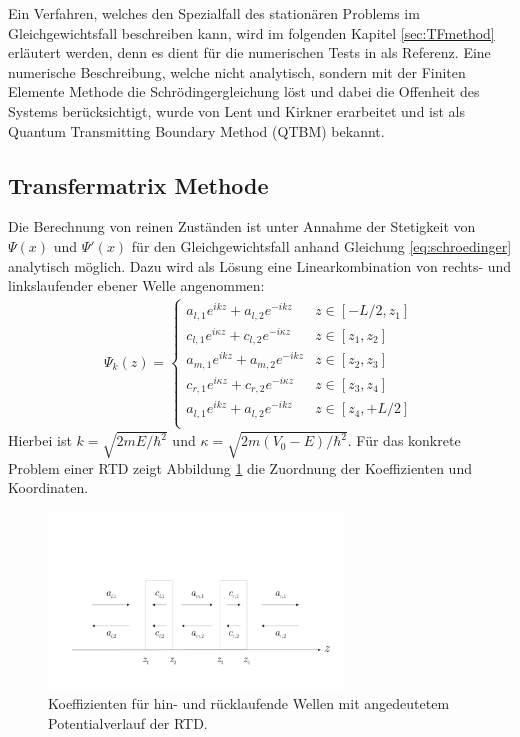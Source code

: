 Ein Verfahren, welches den Spezialfall des stationären Problems im Gleichgewichtsfall beschreiben kann, wird im folgenden Kapitel \ref{sec:TFmethod} erläutert werden, denn es dient für die numerischen Tests in  als Referenz. Eine numerische Beschreibung, welche nicht analytisch, sondern mit der Finiten Elemente Methode die Schrödingergleichung löst und dabei die Offenheit des Systems berücksichtigt, wurde von Lent und Kirkner \cite{qtbm} erarbeitet und ist als Quantum Transmitting Boundary Method (QTBM) bekannt.

\subsection{Transfermatrix Methode}
\label{sec:TFmethod}
Die Berechnung von reinen Zuständen ist unter Annahme der Stetigkeit von $\Psi(x)$ und $\Psi'(x)$ für den Gleichgewichtsfall anhand Gleichung \eqref{eq:schroedinger} analytisch möglich. Dazu wird als Lösung eine Linearkombination von rechts- und linkslaufender ebener Welle angenommen:
\begin{equation}
  \begin{aligned}
    \Psi_k(z)=
    \begin{cases}
    a_{l,1}e^{ikz} + a_{l,2}e^{-ikz}              & z\in[-L/2,z_1] \\
    c_{l,1}e^{i\kappa z} + c_{l,2}e^{-i\kappa z}  & z\in[z_1, z_2] \\
    a_{m,1}e^{ikz} + a_{m,2}e^{-ikz}              & z\in[z_2,z_3] \\
    c_{r,1}e^{i\kappa z} + c_{r,2}e^{-i\kappa z}  & z\in[z_3, z_4] \\
    a_{l,1}e^{ikz} + a_{l,2}e^{-ikz}              & z\in[z_4, +L/2] \\
    \end{cases}
  \end{aligned}
\end{equation}
Hierbei ist $k=\sqrt{2mE/\hbar^2}$ und $\kappa=\sqrt{2m(V_0-E)/\hbar^2}$.
Für das konkrete Problem einer RTD zeigt Abbildung \ref{fig:tf1} die Zuordnung der Koeffizienten und Koordinaten. 
\begin{figure}
  \centering
  \includegraphics[width=0.7\textwidth]{files/TF_variables.pdf}
  \caption{Koeffizienten für hin- und rücklaufende Wellen mit angedeutetem Potentialverlauf der RTD.}
  \label{fig:tf1}
\end{figure}
